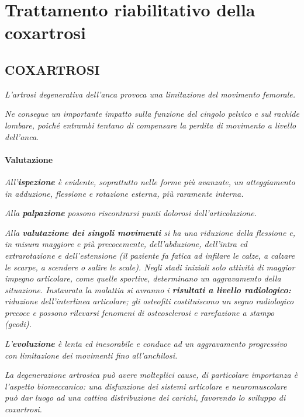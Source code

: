 
\section{Trattamento riabilitativo della coxartrosi}


\subsection{COXARTROSI}



\emph{L'artrosi degenerativa dell'anca provoca una limitazione del
movimento femorale.}

\emph{Ne consegue un importante impatto sulla funzione del cingolo
pelvico e sul rachide lombare, poiché entrambi tentano di compensare la
perdita di movimento a livello dell'anca.}

\paragraph{Valutazione}


\emph{All'\textbf{ispezione} è evidente, soprattutto nelle forme più
avanzate, un atteggiamento in adduzione, flessione e rotazione esterna, più raramente interna.}

\emph{Alla \textbf{palpazione} possono riscontrarsi punti dolorosi
dell'articolazione.}

\emph{Alla \textbf{valutazione dei singoli movimenti} si ha una
riduzione della flessione e, in misura maggiore e più precocemente,
dell'abduzione, dell'intra ed extrarotazione e dell'estensione (il
paziente fa fatica ad infilare le calze, a calzare le scarpe, a scendere o salire le scale). Negli
stadi iniziali solo attività di maggior impegno articolare, come quelle sportive, determinano un aggravamento
della situazione. Instaurata la malattia si avranno i \textbf{risultati
a livello radiologico:} riduzione dell'interlinea articolare; gli osteofiti costituiscono
un segno radiologico precoce e possono rilevarsi fenomeni di
osteosclerosi e rarefazione a stampo (geodi).}

\emph{L'\textbf{evoluzione} è lenta ed inesorabile e conduce ad un
aggravamento progressivo con limitazione dei movimenti fino all'anchilosi.}

\emph{La degenerazione artrosica può avere molteplici cause, di
particolare importanza è l'aspetto biomeccanico: una disfunzione dei
sistemi articolare e neuromuscolare può dar luogo ad una cattiva
distribuzione dei carichi, favorendo lo sviluppo di coxartrosi.}
